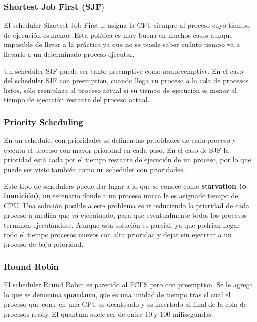 \documentclass{article}
\begin{document}
\subsubsection{Shortest Job First (SJF)}

El scheduler Shortest Job First le asigna la CPU siempre al proceso cuyo tiempo de ejecuci\'on es menor. Esta pol\'itica es muy buena en muchos casos aunque imposible de llevar a la pr\'actica ya que no se puede saber cu\'anto tiempo va a llevarle a un determinado proceso ejecutar.

Un scheduler SJF puede ser tanto preemptive como nonpreemptive. En el caso del scheduler SJF con preemption, cuando llega un proceso a la cola de procesos listos, s\'olo reemplaza al proceso actual si su tiempo de ejecuci\'on es menor al tiempo de ejecuci\'on restante del proceso actual.

\subsubsection{Priority Scheduling}

En un scheduler con prioridades se definen las prioridades de cada proceso y ejecuta el proceso con mayor prioridad en cada paso. En el caso de SJF la prioridad est\'a dada por el tiempo restante de ejecuci\'on de un proceso, por lo que puede ser visto tambi\'en como un scheduler con prioridades.

Este tipo de schedulers puede dar lugar a lo que se conoce como \textbf{starvation (o inanici\'on)}, un escenario donde a un proceso nunca le es asignado tiempo de CPU. Una soluci\'on posible a este problema es ir reduciendo la prioridad de cada proceso a medida que va ejecutando, para que eventualmente todos los procesos terminen ejecut\'andose. Aunque esta soluci\'on es parcial, ya que podr\'ian llegar todo el tiempo procesos nuevos con alta prioridad y dejar sin ejecutar a un proceso de baja prioridad.

\subsubsection{Round Robin}

El scheduler Round Robin es parecido al FCFS pero con preemption. Se le agrega lo que se denomina \textbf{quantum}, que es una unidad de tiempo tras el cual el proceso que corre en una CPU es desalojado y es insertado al final de la cola de procesos ready. El quantum suele ser de entre 10 y 100 milisegundos.
\end{document}
